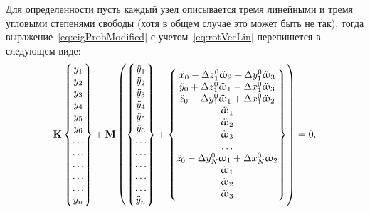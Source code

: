 Для определенности пусть каждый узел описывается тремя линейными и тремя угловыми степенями свободы (хотя в общем случае это может быть не так), тогда выражение~\eqref{eq:eigProbModified} с учетом~\eqref{eq:rotVecLin} перепишется в следующем виде:
\begin{equation}
	\mathbf{K}
	\begin{Bmatrix}
	y_1 \\ y_2 \\ y_3 \\ y_4 \\ y_5 \\ y_6 \\
	\hdots \\ \hdots \\ \hdots \\ \hdots \\ \hdots \\
	y_n
	\end{Bmatrix}
	 + \mathbf{M} \left(
	\begin{Bmatrix}
	\ddot{y}_1 \\ \ddot{y}_2 \\ \ddot{y}_3 \\ \ddot{y}_4 \\ \ddot{y}_5 \\ \ddot{y}_6 \\
	\hdots \\ \hdots \\ \hdots \\ \hdots \\ \hdots \\
	\ddot{y}_n
	\end{Bmatrix}
	 +
	 \begin{Bmatrix}
		\ddot{x}_0 - \Delta z_1^0 \ddot{\upomega}_2 + \Delta y_1^0 \ddot{\upomega}_3 \\
		\ddot{y}_0 + \Delta z_1^0 \ddot{\upomega}_1 - \Delta x_1^0 \ddot{\upomega}_3 \\
		\ddot{z}_0 -\Delta y_1^0 \ddot{\upomega}_1 + \Delta x_1^0 \ddot{\upomega}_2 \\
		\ddot{\upomega}_1 \\
		\ddot{\upomega}_2	\\
		\ddot{\upomega}_3 \\
		\hdots \\
		\ddot{z}_0 -\Delta y_N^0 \ddot{\upomega}_1 + \Delta x_N^0 \ddot{\upomega}_2 \\
		\ddot{\upomega}_1 \\
		\ddot{\upomega}_2	\\
		\ddot{\upomega}_3 \\
	 \end{Bmatrix}
	 \right) = 0.
	 \label{eq:motionModified}
\end{equation}

